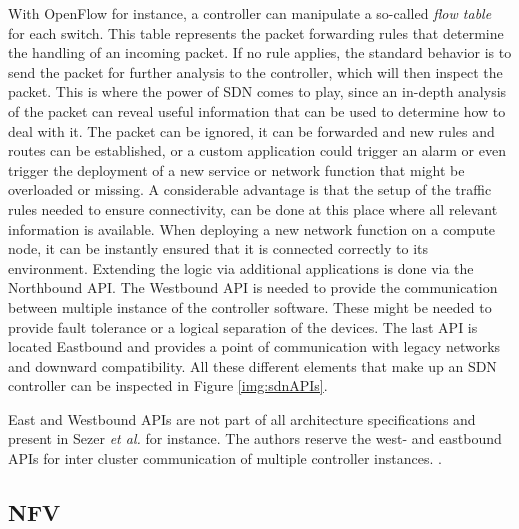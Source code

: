 With OpenFlow for instance, a controller can manipulate a so-called \textit{flow table } for each switch. This table represents the packet forwarding rules that determine the handling of an incoming packet. If no rule applies, the standard behavior is to send the packet for further analysis to the controller, which will then inspect the packet. This is where the power of SDN comes to play, since an in-depth analysis of the packet can reveal useful information that can be used to determine how to deal with it. The packet can be ignored, it can be forwarded and new rules and routes can be established, or a custom application could trigger an alarm or even trigger the deployment of a new service or network function that might be overloaded or missing. A considerable advantage is that the setup of the traffic rules needed to ensure connectivity, can be done at this place where all relevant information is available. When deploying a new network function on a compute node, it can be instantly ensured that it is connected correctly to its environment. Extending the logic via additional applications is done via the Northbound API. The Westbound API is needed to provide the communication between multiple instance of the controller software. These might be needed to provide fault tolerance or a logical separation of the devices. The last API is located Eastbound and provides a point of communication with legacy networks and downward compatibility. All these different elements that make up an SDN controller can be inspected in Figure \ref{img:sdnAPIs}.

East and Westbound APIs are not part of all architecture specifications and present in Sezer \textit{et al.} \cite{sezer2013we} for instance. The authors reserve the west- and eastbound APIs for inter cluster communication of multiple controller instances. \cite{hu2014survey} \cite{jarschel2014interfaces} \cite{nunes2014survey} \cite{sezer2013we} \cite{shin2012software} \cite{jammal2014software}.

\subsection{NFV}

